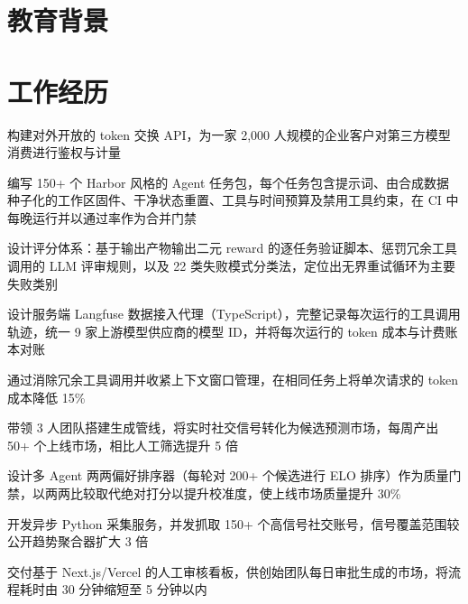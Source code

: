 \documentclass[10pt]{article}
\begin{document}

\section{教育背景}


\section{工作经历}
\begin{bullets}
  \item 构建对外开放的 token 交换 API，为一家 2,000 人规模的企业客户对第三方模型消费进行鉴权与计量
  \item 编写 150+ 个 Harbor 风格的 Agent 任务包，每个任务包含提示词、由合成数据种子化的工作区固件、干净状态重置、工具与时间预算及禁用工具约束，在 CI 中每晚运行并以通过率作为合并门禁
  \item 设计评分体系：基于输出产物输出二元 reward 的逐任务验证脚本、惩罚冗余工具调用的 LLM 评审规则，以及 22 类失败模式分类法，定位出无界重试循环为主要失败类别
  \item 设计服务端 Langfuse 数据接入代理（TypeScript），完整记录每次运行的工具调用轨迹，统一 9 家上游模型供应商的模型 ID，并将每次运行的 token 成本与计费账本对账
  \item 通过消除冗余工具调用并收紧上下文窗口管理，在相同任务上将单次请求的 token 成本降低 15\%
\end{bullets}

\begin{bullets}
  \item 带领 3 人团队搭建生成管线，将实时社交信号转化为候选预测市场，每周产出 50+ 个上线市场，相比人工筛选提升 5 倍
  \item 设计多 Agent 两两偏好排序器（每轮对 200+ 个候选进行 ELO 排序）作为质量门禁，以两两比较取代绝对打分以提升校准度，使上线市场质量提升 30\%
  \item 开发异步 Python 采集服务，并发抓取 150+ 个高信号社交账号，信号覆盖范围较公开趋势聚合器扩大 3 倍
  \item 交付基于 Next.js/Vercel 的人工审核看板，供创始团队每日审批生成的市场，将流程耗时由 30 分钟缩短至 5 分钟以内
\end{bullets}
\end{document}
